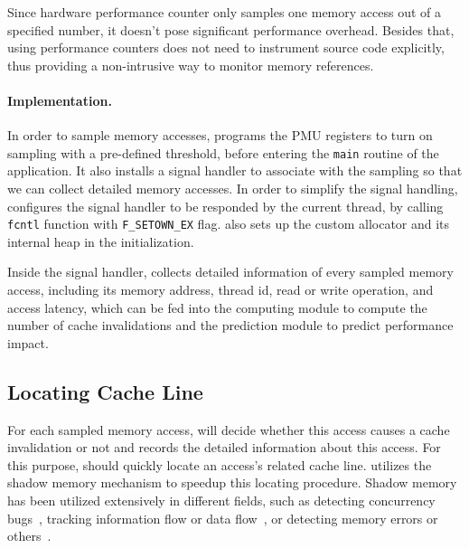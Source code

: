 Since hardware performance counter only samples one memory access out of a specified number, it doesn't pose significant performance overhead. Besides that, using performance counters does not need to instrument source code explicitly, thus providing a non-intrusive way to monitor memory references. 

\paragraph{Implementation.} 

In order to sample memory accesses, \cheetah{} programs the PMU registers to turn on sampling with a pre-defined threshold, before entering the \texttt{main} routine of the application. It also installs a signal handler to associate with the sampling so that we can collect detailed memory accesses. In order to simplify the signal handling, \Cheetah{} configures the signal handler to be responded by the current thread, by calling \texttt{fcntl} function with \texttt{F\_SETOWN\_EX} flag. \cheetah{} also sets up the custom allocator and its internal heap in the initialization.

Inside the signal handler, \Cheetah{} collects detailed information of every sampled memory access, including its memory address, thread id, read or write operation, and access latency, which can be fed into the computing module to compute the number of cache invalidations and the prediction module to predict performance impact.

\subsection{Locating Cache Line}
\label{sec:shadow}

For each sampled memory access, \cheetah{} will decide whether this access causes a cache invalidation or not and records the detailed information about this access. For this purpose, \cheetah{} should quickly locate an access's related cache line. \Cheetah{} utilizes the shadow memory mechanism to speedup this locating procedure.
Shadow memory has been utilized extensively in different fields, such as detecting concurrency bugs~\cite{Harrow:2000:RCM:645880.672080, helgrind, 404681, Savage:1997:EDD:268998.266641}, tracking information flow or data flow~\cite{Cheng:2006:TEF:1157733.1157903, Newsome05dynamictaint, Qin:2006:LLP:1194816.1194834}, or detecting memory errors or others~\cite{qinzhao, Hastings91purify:fast, Seward:2005:UVD:1247360.1247362, Narayanasamy:2006:ALO:1140277.1140303}.  

